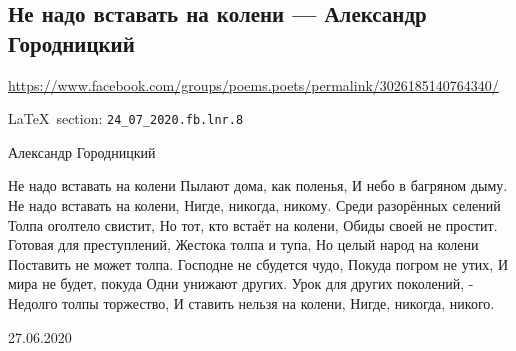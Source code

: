  
 
\subsection{Не надо вставать на колени --- Александр Городницкий}
\label{sec:24_07_2020.fb.lnr.8}
\url{https://www.facebook.com/groups/poems.poets/permalink/3026185140764340/}
  
\vspace{0.5cm}
\LaTeX~section: \verb|24_07_2020.fb.lnr.8|
\vspace{0.5cm}

\obeycr
Александр Городницкий

Не надо вставать на колени
Пылают дома, как поленья,
И небо в багряном дыму.
Не надо вставать на колени,
Нигде, никогда, никому.
Среди разорённых селений
Толпа оголтело свистит,
Но тот, кто встаёт на колени,
Обиды своей не простит.
Готовая для преступлений,
Жестока толпа и тупа,
Но целый народ на колени
Поставить не может толпа.
Господне не сбудется чудо,
Покуда погром не утих,
И мира не будет, покуда
Одни унижают других.
Урок для других поколений, -
Недолго толпы торжество,
И ставить нельзя на колени,
Нигде, никогда, никого.

27.06.2020
\restorecr
